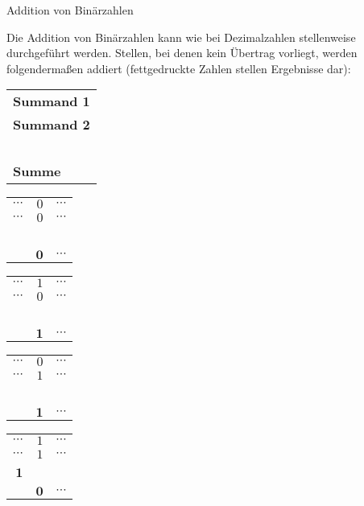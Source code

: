 \begin{exercise}{Addition von Binärzahlen}
\begin{body}
Die Addition von Binärzahlen kann wie bei Dezimalzahlen stellenweise durchgeführt werden. Stellen, bei denen kein Übertrag vorliegt, werden folgendermaßen addiert (fettgedruckte Zahlen stellen Ergebnisse dar):
\medskip
\begin{center}
\begin{tabular}{l}
\textbf{Summand 1} \\
\textbf{Summand 2} \\
{\footnotesize\ } \\
\textbf{Summe}
\end{tabular}
\hspace{2em}
\begin{tabular}{rrr}
$\dotsb$   & $0$ & $\dotsb$  \\
$\dotsb$   & $0$ & $\dotsb$  \\
{\footnotesize\ } & {\footnotesize\ } & {\footnotesize\ } \\
\hline
           & $\boldsymbol{0}$ & $\dotsb$
\end{tabular}
\hspace{1.5em}
\begin{tabular}{rrr}
$\dotsb$   & $1$ & $\dotsb$  \\
$\dotsb$   & $0$ & $\dotsb$  \\
{\footnotesize\ } & {\footnotesize\ } & {\footnotesize\ } \\
\hline
           & $\boldsymbol{1}$ & $\dotsb$
\end{tabular}
\hspace{1.5em}
\begin{tabular}{rrr}
$\dotsb$   & $0$ & $\dotsb$  \\
$\dotsb$   & $1$ & $\dotsb$  \\
{\footnotesize\ } & {\footnotesize\ } & {\footnotesize\ } \\
\hline
           & $\boldsymbol{1}$ & $\dotsb$
\end{tabular}
\hspace{1.5em}
\begin{tabular}{rrr}
$\dotsb$     & $1$ & $\dotsb$  \\
$\dotsb$     & $1$ & $\dotsb$  \\
{\footnotesize $\boldsymbol{1}$} & {\footnotesize\ } & {\footnotesize\ } \\
\hline
             & $\boldsymbol{0}$ & $\dotsb$
\end{tabular}
\end{center}

\end{body}
\end{exercise}
